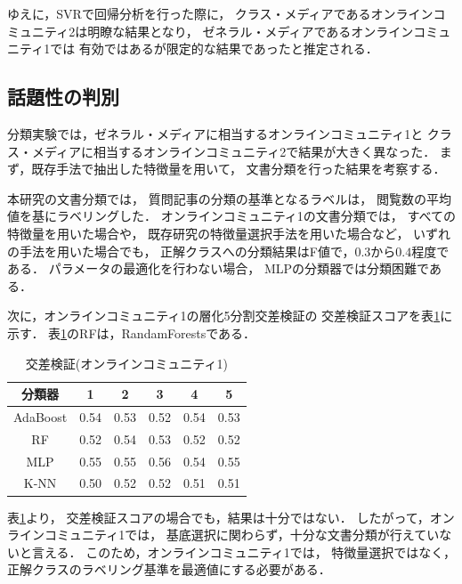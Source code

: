 \documentclass[12pt,a4paper,twocolumn,twoside]{jsik}
\begin{document}
ゆえに，SVRで回帰分析を行った際に，
クラス・メディアであるオンラインコミュニティ2は明瞭な結果となり，
ゼネラル・メディアであるオンラインコミュニティ1では
有効ではあるが限定的な結果であったと推定される．

\subsection{話題性の判別}
分類実験では，ゼネラル・メディアに相当するオンラインコミュニティ1と
クラス・メディアに相当するオンラインコミュニティ2で結果が大きく異なった．
%
まず，既存手法で抽出した特徴量を用いて，
文書分類を行った結果を考察する．

本研究の文書分類では，
質問記事の分類の基準となるラベルは，
閲覧数の平均値を基にラベリングした．
%
オンラインコミュニティ1の文書分類では，
すべての特徴量を用いた場合や，
既存研究の特徴量選択手法を用いた場合など，
いずれの手法を用いた場合でも，
正解クラスへの分類結果はF値で，$0.3$から$0.4$程度である．
パラメータの最適化を行わない場合，
MLPの分類器では分類困難である．

次に，オンラインコミュニティ1の層化5分割交差検証の
交差検証スコアを表\ref{tab:nmf_classifier_apple}に示す．
表\ref{tab:nmf_classifier_apple}のRFは，RandamForestsである．
%
\begin{table}[htb]
  \caption{交差検証(オンラインコミュニティ1)} 
  \label{tab:nmf_classifier_apple}
  \begin{center}
  \begin{tabular}{c|c|c|c|c|c} \hline
    分類器 & 1 & 2 & 3 & 4 & 5 \\ \hline \hline
    AdaBoost & 0.54 & 0.53 & 0.52 & 0.54 & 0.53 \\ \hline 
    RF & 0.52 & 0.54 & 0.53 & 0.52 & 0.52 \\ \hline 
    MLP & 0.55 & 0.55 & 0.56 & 0.54 & 0.55 \\ \hline 
    K-NN & 0.50 & 0.52 & 0.52 & 0.51 & 0.51 \\ \hline
  \end{tabular}
  \end{center}
\end{table}

表\ref{tab:nmf_classifier_apple}より，
交差検証スコアの場合でも，結果は十分ではない．
したがって，オンラインコミュニティ1では，
基底選択に関わらず，十分な文書分類が行えていないと言える．
%
このため，オンラインコミュニティ1では，
特徴量選択ではなく，
正解クラスのラベリング基準を最適値にする必要がある．
\end{document}
